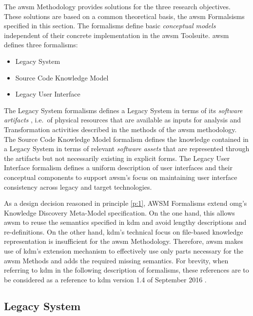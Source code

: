 The \gls{awsm} Methodology provides solutions for the three research objectives.
These solutions are based on a common theoretical basis, the \gls{awsm} Formalsisms specified in this section.
The formalisms define basic \emph{conceptual models} independent of their concrete implementation in the \gls{awsm} Toolsuite.
\gls{awsm} defines three formalisms:
\begin{itemize}
\item Legacy System
\item Source Code Knowledge Model
\item Legacy User Interface
\end{itemize}
The \gls{Legacy System} formalisms defines a \gls{Legacy System} in terms of its \emph{software \glspl{artifact}} \autocite{OMG2016KDM}, i.e.~of physical resources that are available as inputs for analysis and \gls{Transformation} activities described in the methods of the \gls{awsm} methodology.
The Source Code Knowledge Model formalism defines the knowledge contained in a \gls{Legacy System} in terms of relevant \emph{software assets} \autocite{OMG2016KDM} that are represented through the \glspl{artifact} but not necessarily existing in explicit forms.
The Legacy User Interface formalism defines a uniform description of user interfaces and their conceptual components to support \gls{awsm}'s focus on maintaining user interface consistency across legacy and target technologies.

As a design decision reasoned in principle \cref{p:1}, AWSM Formalisms extend \gls{omg}'s Knowledge Discovery Meta-Model specification.
On the one hand, this allows \gls{awsm} to reuse the semantics specified in \gls{kdm} and avoid lengthy descriptions and re-definitions.
On the other hand, \gls{kdm}'s technical focus on file-based knowledge representation is insufficient for the \gls{awsm} Methodology.
Therefore, \gls{awsm} makes use of \gls{kdm}'s extension mechanism to effectively use only parts necessary \autocite{OMG2016KDM} for the \gls{awsm} Methods and adds the required missing semantics.
For brevity, when referring to \gls{kdm} in the following description of formalisms, these references are to be considered as a reference to \gls{kdm} version 1.4 of September 2016 \autocite{OMG2016KDM}.

\vspace{-18pt}
\hypertarget{sec:formalisms.ls}{%
\subsection{Legacy System}\label{sec:formalisms.ls}}
\vspace{4pt}

